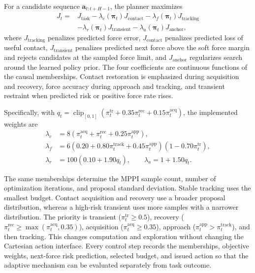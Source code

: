 For a candidate sequence $\mathbf a_{t:t+H-1}$, the planner maximizes
\begin{align}
J_t={}&J_{\mathrm{task}}
-\lambda_c(\boldsymbol\pi_t)J_{\mathrm{contact}}
-\lambda_f(\boldsymbol\pi_t)J_{\mathrm{tracking}}\nonumber\\
&-\lambda_r(\boldsymbol\pi_t)J_{\mathrm{transient}}
-\lambda_a(\boldsymbol\pi_t)J_{\mathrm{anchor}},
\label{eq:ra_objective}
\end{align}
where $J_{\mathrm{tracking}}$ penalizes predicted force error,
$J_{\mathrm{contact}}$ penalizes predicted loss of useful contact,
$J_{\mathrm{transient}}$ penalizes predicted next force above the
soft force margin and rejects candidates at the sampled force limit, and
$J_{\mathrm{anchor}}$ regularizes search around the learned policy prior.
The four coefficients are continuous functions of the causal memberships.
Contact restoration is emphasized during acquisition and recovery, force
accuracy during approach and tracking, and transient restraint when predicted
risk or positive force rate rises.

Specifically, with
$q_t=\operatorname{clip}_{[0,1]}(\pi_t^{\mathrm{tr}}+
0.35\pi_t^{\mathrm{rec}}+0.15\pi_t^{\mathrm{acq}})$, the implemented weights
are
\begin{align}
\lambda_c &=8(\pi_t^{\mathrm{acq}}+\pi_t^{\mathrm{rec}}
                    +0.25\pi_t^{\mathrm{app}}),\\
\lambda_f &=6(0.20+0.80\pi_t^{\mathrm{track}}
                    +0.45\pi_t^{\mathrm{app}})(1-0.70\pi_t^{\mathrm{tr}}),\\
\lambda_r &=100(0.10+1.90q_t),\qquad
\lambda_a=1+1.50q_t.
\label{eq:adaptive_weights}
\end{align}

The same memberships determine the MPPI sample count, number of optimization
iterations, and proposal standard deviation. Stable tracking uses the smallest
budget. Contact acquisition and recovery use a broader proposal distribution,
whereas a high-risk transient uses more samples with a narrower distribution.
The priority is transient ($\pi_t^{\mathrm{tr}}\geq0.5$), recovery
($\pi_t^{\mathrm{rec}}\geq\max(\pi_t^{\mathrm{acq}},0.35)$), acquisition
($\pi_t^{\mathrm{acq}}\geq0.35$), approach
($\pi_t^{\mathrm{app}}>\pi_t^{\mathrm{track}}$), and then tracking.
This changes computation and exploration without changing the Cartesian action
interface. Every control step records the memberships, objective weights,
next-force risk prediction, selected budget, and issued action so that the
adaptive mechanism can be evaluated separately from task outcome.

